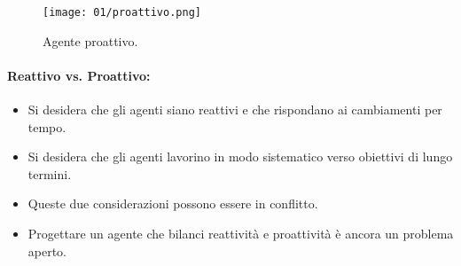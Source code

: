 
\begin{figure}[h]
  \centering
  \texttt{[image: 01/proattivo.png]}
  \caption{Agente proattivo.}
\end{figure}

\paragraph{Reattivo vs. Proattivo:}

\begin{itemize}
  \item Si desidera che gli agenti siano reattivi e che rispondano ai cambiamenti per tempo. 
  \item Si desidera che gli agenti lavorino in modo sistematico verso obiettivi di lungo termini. 
  \item Queste due considerazioni possono essere in conflitto. 
  \item Progettare un agente che bilanci reattività e proattività è ancora un problema aperto.
\end{itemize}







